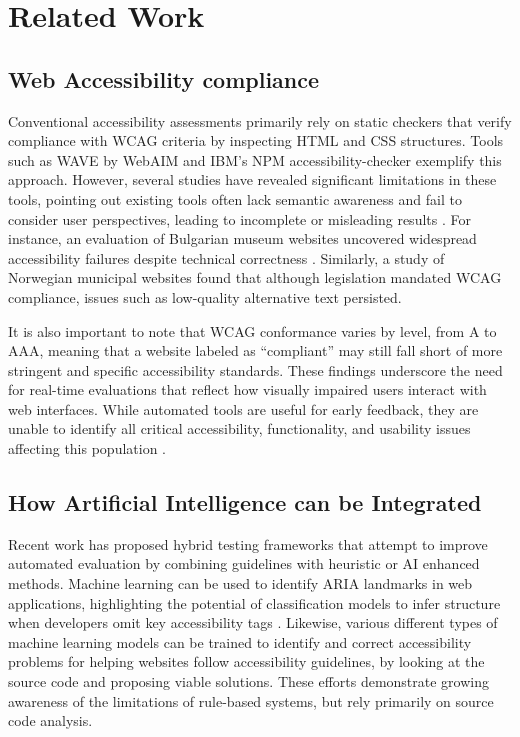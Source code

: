 
\section{Related Work}

\subsection{Web Accessibility compliance}

Conventional accessibility assessments primarily rely on static checkers that verify compliance with \ac{WCAG} criteria by inspecting HTML and CSS structures. Tools such as WAVE by WebAIM and IBM's NPM accessibility-checker exemplify this approach\cite{w3c_accessibility_tools_2025}. However, several studies have revealed significant limitations in these tools, pointing out existing tools often lack semantic awareness and fail to consider user perspectives, leading to incomplete or misleading results \cite{ara2024inclusive}. For instance, an evaluation of Bulgarian museum websites uncovered widespread accessibility failures despite technical correctness \cite{todorov2022accessibility}. Similarly, a study of Norwegian municipal websites found that although legislation mandated \ac{WCAG} compliance, issues such as low-quality alternative text persisted\cite{inal2025does}.

It is also important to note that \ac{WCAG} conformance varies by level, from A to AAA, meaning that a website labeled as “compliant” may still fall short of more stringent and specific accessibility standards. These findings underscore the need for real-time evaluations that reflect how visually impaired users interact with web interfaces. While automated tools are useful for early feedback, they are unable to identify all critical accessibility, functionality, and usability issues affecting this population \cite{todorov2022accessibility}.

\subsection{How Artificial Intelligence can be Integrated}

Recent work has proposed hybrid testing frameworks that attempt to improve automated evaluation by combining guidelines with heuristic or \ac{AI} enhanced methods. Machine learning can be used to identify ARIA landmarks in web applications, highlighting the potential of classification models to infer structure when developers omit key accessibility tags \cite{watanabe2024accessibility}. Likewise, various different types of machine learning models can be trained to identify and correct accessibility problems for helping websites follow accessibility guidelines, by looking at the source code and proposing viable solutions\cite{ramineni2024leveraging, kuszczynski2023comparative}. These efforts demonstrate growing awareness of the limitations of rule-based systems, but rely primarily on source code analysis.

